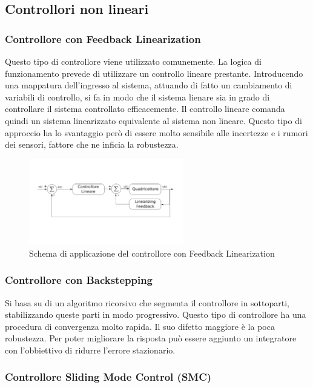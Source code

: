 \subsection{Controllori non lineari}

\subsubsection{Controllore con Feedback Linearization}

Questo tipo di controllore viene utilizzato comunemente. La logica di funzionamento prevede di utilizzare un controllo lineare prestante. Introducendo una mappatura dell'ingresso al sistema, attuando di fatto un cambiamento di variabili di controllo, si fa in modo che il sistema lienare sia in grado di controllare il sistema controllato efficacemente. Il controllo lineare comanda quindi un sistema linearizzato equivalente al sistema non lineare. Questo tipo di approccio ha lo svantaggio però di essere molto sensibile alle incertezze e i rumori dei sensori, fattore che ne inficia la robustezza.

\begin{figure}
	\centering
	\includegraphics[width=0.6\textwidth]{SistemaQuadrirotore/Figure/FLP}
	\caption{Schema di applicazione del controllore con Feedback Linearization}
\end{figure}

\subsubsection{Controllore con Backstepping}

Si basa su di un algoritmo ricorsivo che segmenta il controllore in sottoparti, stabilizzando queste parti in modo progressivo. Questo tipo di controllore ha una procedura di convergenza molto rapida. Il suo difetto maggiore è la poca robustezza. Per poter migliorare la risposta può essere aggiunto un integratore con l'obbiettivo di ridurre l'errore stazionario.


\subsubsection{Controllore Sliding Mode Control (SMC)}

